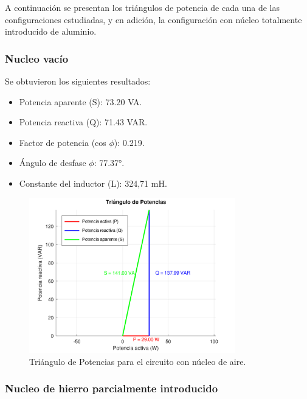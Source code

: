 \documentclass{article}
\begin{document}
        A continuación se presentan los triángulos de potencia de cada una de las configuraciones estudiadas, y en adición,
        la configuración con núcleo totalmente introducido de aluminio. 

        \subsubsection{Nucleo vacío}
            Se obtuvieron los siguientes resultados:
            \begin{itemize}
                \item Potencia aparente (S): 73.20 VA.
                \item Potencia reactiva (Q): 71.43 VAR.
                \item Factor de potencia (cos $\phi$): 0.219.
                \item Ángulo de desfase $\phi$: 77.37°.
                \item Constante del inductor (L): 324,71 mH.
            \end{itemize}

            \begin{figure}[H]
                \centering
                \includegraphics[width=0.8\textwidth]{graficoAire.png}
                \caption{Triángulo de Potencias para el circuito con núcleo de aire.}
                \label{fig:graficoAire}
            \end{figure}
        
        \subsubsection{Nucleo de hierro parcialmente introducido}
            
\end{document}
